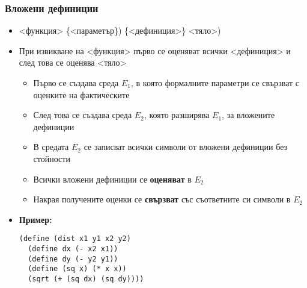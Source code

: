 \documentclass[alsotrans]{beamerswitch}
\begin{document}
\begin{frame}[fragile]
  \frametitle{Вложени дефиниции}

  \begin{itemize}[<+->]
  \item {}<функция> \{<параметър\}\tta) \{<дефиниция>\} <тяло>\tta)
  \item При извикване на <функция> първо се оценяват всички <дефиниция> и след това се оценява <тяло>
    \begin{itemize}
    \item Първо се създава среда $E_1$, в която формалните параметри се свързват с оценките на фактическите
    \item След това се създава среда $E_2$, която разширява $E_1$, за вложените дефиниции
    \item В средата $E_2$ се записват всички символи от вложени дефиниции \alert{без стойности}
    \item Всички вложени дефиниции се \textbf{оценяват} в $E_2$
    \item Накрая получените оценки се \textbf{свързват} със съответните си символи в $E_2$
    \end{itemize}
  \item \textbf{Пример:}\hspace{5ex}
    \begin{minipage}[t]{.5\textwidth}
      \lstsmall
\begin{lstlisting}[aboveskip=-1.4\medskipamount]
(define (dist x1 y1 x2 y2)
  (define dx (- x2 x1))
  (define dy (- y2 y1))
  (define (sq x) (* x x))
  (sqrt (+ (sq dx) (sq dy))))
\end{lstlisting}
    \end{minipage}
  \end{itemize}
\end{frame}
\end{document}
